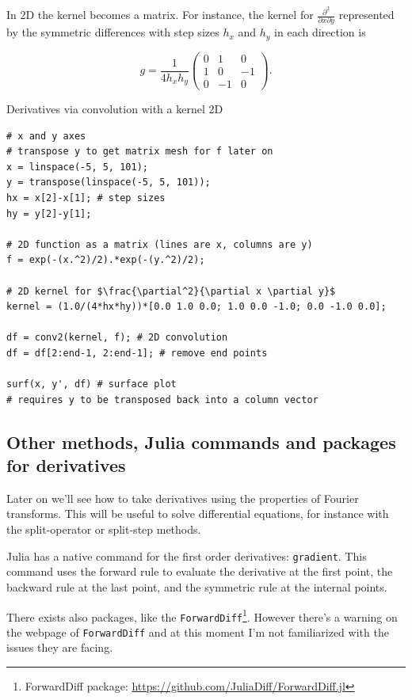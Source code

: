 In 2D the kernel becomes a matrix. For instance, the kernel for $\frac{\partial^2}{\partial x \partial y}$ represented by the symmetric differences with step sizes $h_x$ and $h_y$ in each direction is

\begin{equation}
 g = \dfrac{1}{4 h_x h_y}
 \begin{pmatrix}
  0 & 1 & 0 \\
  1 & 0 & -1 \\
  0 & -1 & 0
 \end{pmatrix}.
\end{equation}

\begin{example}{Derivatives via convolution with a kernel 2D}
\label{ex:conv2}
\begin{verbatim}
# x and y axes
# transpose y to get matrix mesh for f later on
x = linspace(-5, 5, 101);
y = transpose(linspace(-5, 5, 101));
hx = x[2]-x[1]; # step sizes
hy = y[2]-y[1];

# 2D function as a matrix (lines are x, columns are y)
f = exp(-(x.^2)/2).*exp(-(y.^2)/2);

# 2D kernel for $\frac{\partial^2}{\partial x \partial y}$
kernel = (1.0/(4*hx*hy))*[0.0 1.0 0.0; 1.0 0.0 -1.0; 0.0 -1.0 0.0];

df = conv2(kernel, f); # 2D convolution
df = df[2:end-1, 2:end-1]; # remove end points

surf(x, y', df) # surface plot
# requires y to be transposed back into a column vector
\end{verbatim}
\end{example}


\subsection{Other methods, Julia commands and packages for derivatives}

Later on we'll see how to take derivatives using the properties of Fourier transforms. This will be useful to solve differential equations, for instance with the split-operator or split-step methods.

Julia has a native command for the first order derivatives: \texttt{gradient}. This command uses the forward rule to evaluate the derivative at the first point, the backward rule at the last point, and the symmetric rule at the internal points.

There exists also packages, like the \texttt{ForwardDiff}\footnote{ForwardDiff package: \url{https://github.com/JuliaDiff/ForwardDiff.jl}}. However there's a warning on the webpage of \texttt{ForwardDiff} and at this moment I'm not familiarized with the issues they are facing.

